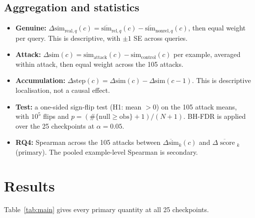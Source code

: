 \documentclass[11pt]{article}
\newcommand{\qsim}{\ensuremath{\mathrm{sim}}}
\newcommand{\dsim}{\ensuremath{\Delta\mathrm{sim}}}
\newcommand{\dstep}{\ensuremath{\Delta\mathrm{step}}}
\newcommand{\score}{\operatorname{score}}
\begin{document}
\subsection{Aggregation and statistics}

\begin{itemize}[nosep]
  \item \textbf{Genuine:} $\dsim_{\mathrm{real},q}(c)=\overline{\qsim}_{\mathrm{rel},q}(c)-\overline{\qsim}_{\mathrm{nonrel},q}(c)$,
        then equal weight per query. This is descriptive, with $\pm1$ SE across
        queries.
  \item \textbf{Attack:} $\dsim(c)=\qsim_{\mathrm{attack}}(c)-\qsim_{\mathrm{control}}(c)$ per
        example, averaged within attack, then equal weight across the 105 attacks.
  \item \textbf{Accumulation:} $\dstep(c)=\dsim(c)-\dsim(c-1)$. This is descriptive
        localisation, not a causal effect.
  \item \textbf{Test:} a one-sided sign-flip test (H1: mean $>0$) on the 105 attack
        means, with $10^5$ flips and $p=(\#\{\text{null}\ge\text{obs}\}+1)/(N+1)$.
        BH-FDR is applied over the 25 checkpoints at $\alpha=0.05$.
  \item \textbf{RQ4:} Spearman across the 105 attacks between
        $\overline{\dsim}_k(c)$ and $\overline{\Delta\score}_k$ (primary). The pooled
        example-level Spearman is secondary.
\end{itemize}

\section{Results}

Table~\ref{tab:main} gives every primary quantity at all 25 checkpoints.
\end{document}
